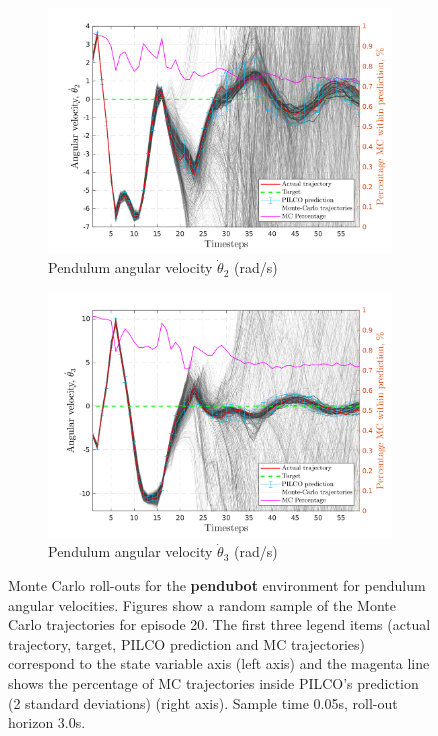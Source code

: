  \begin{figure}[htbp]    
    \begin{subfigure}[b]{1\linewidth}
    \centering
    \includegraphics[height=0.4\textheight,width=1\textwidth]{Chapter3/Figures/pen_MC_rollout_Ep_40_Dim_1.png} 
    \caption{Pendulum angular velocity $\dot \theta_{2}$ (rad/s)} 
    \label{Fig:Re-pen-cart-position} 
  \end{subfigure} 
  \hspace{\fill}  %
  \begin{subfigure}[b]{1\linewidth}
    \centering
    \includegraphics[height=0.4\textheight,width=1\textwidth]{Chapter3/Figures/pen_MC_rollout_Ep_40_Dim_2.png} 
    \caption{Pendulum angular velocity $\dot \theta_{3}$ (rad/s)} 
    \label{Fig:Re-pen-cart-velocity} 
  \end{subfigure} 
\caption[Monte Carlo roll-outs for \textbf{pendubot} pendulum angular velocities]{Monte Carlo roll-outs for the \textbf{pendubot} environment for pendulum angular velocities. Figures show a random sample of the Monte Carlo trajectories for episode 20. The first three legend items (actual trajectory, target, PILCO prediction and MC trajectories) correspond to the state variable axis (left axis) and the magenta line shows the percentage of MC trajectories inside PILCO's prediction (2 standard deviations) (right axis). Sample time 0.05s, roll-out horizon 3.0s.}
\label{Fig:Re-pen-MC-roll-outs-1} 
\end{figure}

